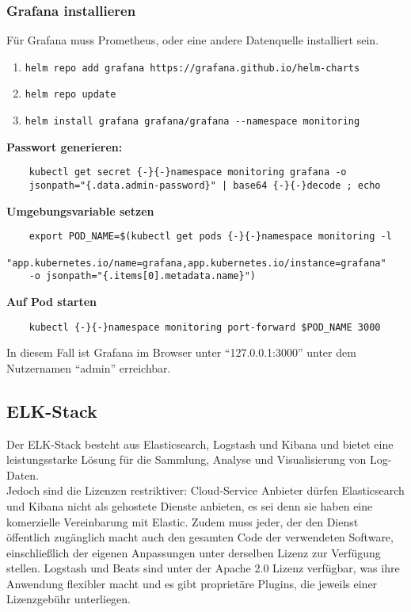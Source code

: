 \subsubsection{Grafana installieren}
Für Grafana muss Prometheus, oder eine andere Datenquelle installiert sein.
\begin{enumerate}
    \item \texttt{helm repo add grafana https://grafana.github.io/helm-charts}
    \item \texttt{helm repo update}
    \item \texttt{helm install grafana grafana/grafana {-}{-}namespace monitoring}
\end{enumerate}
\textbf{Passwort generieren:}
\begin{verbatim}
    kubectl get secret {-}{-}namespace monitoring grafana -o
    jsonpath="{.data.admin-password}" | base64 {-}{-}decode ; echo
\end{verbatim}
\textbf{Umgebungsvariable setzen}
\begin{verbatim}
    export POD_NAME=$(kubectl get pods {-}{-}namespace monitoring -l
    "app.kubernetes.io/name=grafana,app.kubernetes.io/instance=grafana"
    -o jsonpath="{.items[0].metadata.name}")
\end{verbatim}
\textbf{Auf Pod starten}
\begin{verbatim}
    kubectl {-}{-}namespace monitoring port-forward $POD_NAME 3000
\end{verbatim}
In diesem Fall ist Grafana im Browser unter \enquote{127.0.0.1:3000} unter dem  Nutzernamen \enquote{admin} erreichbar.

\subsection{ELK-Stack}
Der ELK-Stack besteht aus Elasticsearch, Logstash und Kibana und bietet eine leistungsstarke Lösung für die Sammlung, Analyse und Visualisierung von Log-Daten.\\
Jedoch sind die Lizenzen restriktiver: Cloud-Service Anbieter dürfen Elasticsearch und Kibana nicht als gehostete Dienste anbieten, es sei denn sie haben eine komerzielle Vereinbarung mit Elastic. Zudem muss jeder, der den Dienst öffentlich zugänglich macht auch den gesamten Code der verwendeten Software, einschließlich der eigenen Anpassungen unter derselben Lizenz zur Verfügung stellen. Logstash und Beats sind unter der Apache 2.0 Lizenz verfügbar, was ihre Anwendung flexibler macht und es gibt proprietäre Plugins, die jeweils einer Lizenzgebühr unterliegen.

